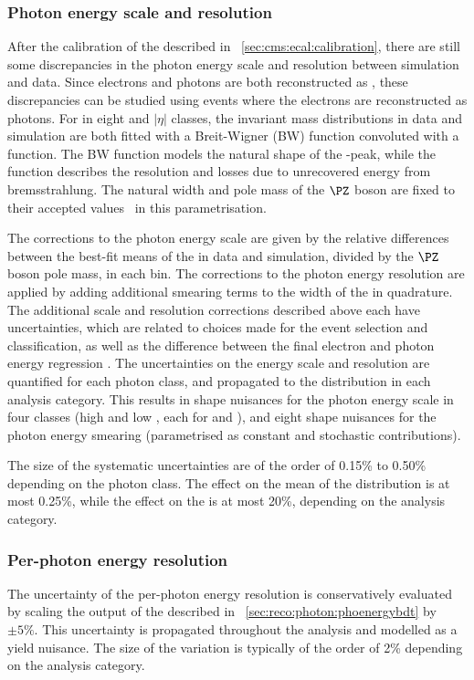 \subsubsection{Photon energy scale and resolution}
After the calibration of the \ECAL described in \Sec~\ref{sec:cms:ecal:calibration}, there are still some discrepancies in the photon energy scale and resolution between simulation and data. Since electrons and photons are both reconstructed as \SC\s, these discrepancies can be studied using \Zee events where the electrons are reconstructed as photons.
For \SC\s in eight \RNINE and $|\eta|$ classes, the invariant mass distributions in data and simulation are both fitted with a Breit-Wigner (BW) function convoluted with a \CB function. The BW function models the natural shape of the \PZ-peak, while the \CB function describes the \ECAL resolution and losses due to unrecovered energy from bremsstrahlung. The natural width and pole mass of the $\PZ$ boson are fixed to their accepted values~\cite{PDGBooklet} in this parametrisation. 

The corrections to the photon energy scale are given by the relative differences between the best-fit means of the \CB in data and simulation, divided by the $\PZ$ boson pole mass, in each bin. The corrections to the photon energy resolution are applied by adding additional smearing terms to the width of the \CB in quadrature. The additional scale and resolution corrections described above each have uncertainties, which are related to choices made for the \Zee event selection and classification, as well as the difference between the final electron and photon energy regression \BDT\s. The uncertainties on the energy scale and resolution are quantified for each photon class, and propagated to the \mgg distribution in each analysis category. This results in shape nuisances for the photon energy scale in four classes (high and low \RNINE, each for \EB and \EE), and eight shape nuisances for the photon energy smearing (parametrised as constant and stochastic contributions). 

The size of the systematic uncertainties are of the order of 0.15\% to 0.50\% depending on the photon class. The effect on the mean of the \mgg distribution is at most 0.25\%, while the effect on the \effSigma is at most 20\%, depending on the analysis category.

\subsubsection{Per-photon energy resolution}
The uncertainty of the per-photon energy resolution is conservatively evaluated by scaling the output of the \PhoEnergyBdt described in \Sec~\ref{sec:reco:photon:phoenergybdt} by $\pm5\%$. This uncertainty is propagated throughout the analysis and modelled as a yield nuisance. The size of the variation is typically of the order of 2\% depending on the analysis category.


